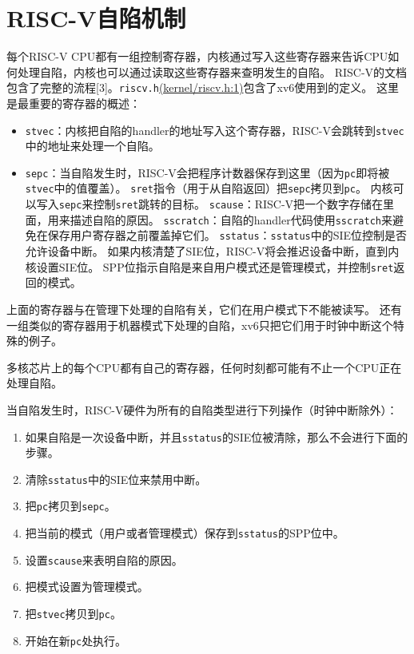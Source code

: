 \section{RISC-V自陷机制}
每个RISC-V CPU都有一组控制寄存器，内核通过写入这些寄存器来告诉CPU如何处理自陷，内核也可以通过读取这些寄存器来查明发生的自陷。
RISC-V的文档包含了完整的流程[3]。\texttt{riscv.h}\href{https://github.com/mit-pdos/xv6-riscv/blob/riscv//kernel/riscv.h#L1}{(kernel/riscv.h:1)}包含了xv6使用到的定义。
这里是最重要的寄存器的概述：
\begin{itemize}
    \item \texttt{stvec}：内核把自陷的handler的地址写入这个寄存器，RISC-V会跳转到\texttt{stvec}中的地址来处理一个自陷。
    \item \texttt{sepc}：当自陷发生时，RISC-V会把程序计数器保存到这里（因为\texttt{pc}即将被\texttt{stvec}中的值覆盖）。
    \texttt{sret}指令（用于从自陷返回）把\texttt{sepc}拷贝到\texttt{pc}。
    内核可以写入\texttt{sepc}来控制\texttt{sret}跳转的目标。
    \texttt{scause}：RISC-V把一个数字存储在里面，用来描述自陷的原因。
    \texttt{sscratch}：自陷的handler代码使用\texttt{sscratch}来避免在保存用户寄存器之前覆盖掉它们。
    \texttt{sstatus}：\texttt{sstatus}中的SIE位控制是否允许设备中断。
    如果内核清楚了SIE位，RISC-V将会推迟设备中断，直到内核设置SIE位。
    SPP位指示自陷是来自用户模式还是管理模式，并控制\texttt{sret}返回的模式。
\end{itemize}

上面的寄存器与在管理下处理的自陷有关，它们在用户模式下不能被读写。
还有一组类似的寄存器用于机器模式下处理的自陷，xv6只把它们用于时钟中断这个特殊的例子。

多核芯片上的每个CPU都有自己的寄存器，任何时刻都可能有不止一个CPU正在处理自陷。

当自陷发生时，RISC-V硬件为所有的自陷类型进行下列操作（时钟中断除外）：
\begin{enumerate}
    \item 如果自陷是一次设备中断，并且\texttt{sstatus}的SIE位被清除，那么不会进行下面的步骤。
    \item 清除\texttt{sstatus}中的SIE位来禁用中断。
    \item 把\texttt{pc}拷贝到\texttt{sepc}。
    \item 把当前的模式（用户或者管理模式）保存到\texttt{sstatus}的SPP位中。
    \item 设置\texttt{scause}来表明自陷的原因。
    \item 把模式设置为管理模式。
    \item 把\texttt{stvec}拷贝到\texttt{pc}。
    \item 开始在新\texttt{pc}处执行。
\end{enumerate}

